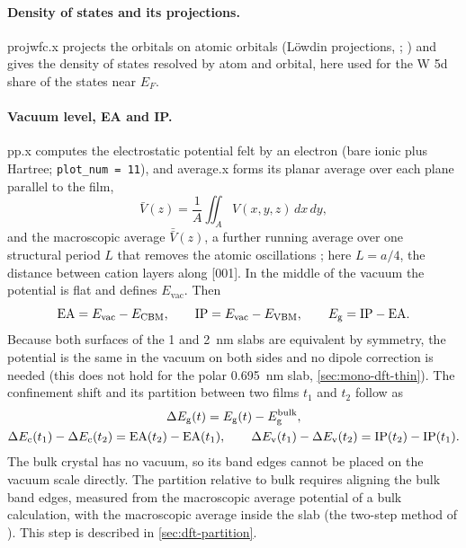 \paragraph{Density of states and its projections.} projwfc.x projects the orbitals on atomic orbitals (L\"owdin
projections, \citealp{Lowdin1950}; \citealp[p.~10]{Giannozzi2009}) and gives the density of states resolved by atom and
orbital, here used for the W 5d share of the states near $E_F$.

\paragraph{Vacuum level, EA and IP.} pp.x computes the electrostatic potential felt by an electron (bare ionic plus
Hartree; \texttt{plot\_num = 11}), and average.x forms its planar average over each plane parallel to the film,
\begin{equation}
\bar V(z) = \frac{1}{A}\iint_A V(x,y,z)\,dx\,dy ,
\label{eq:dft-planar}
\end{equation}
and the macroscopic average $\bar{\bar V}(z)$, a further running average over one structural period $L$ that removes the
atomic oscillations \citep{Baldereschi1988}\citep[p.~10]{Giannozzi2009}; here $L = a/4$, the distance between cation
layers along [001]. In the middle of the vacuum the potential is flat and defines $E_{\mathrm{vac}}$. Then
\begin{equation}
\mathrm{EA} = E_{\mathrm{vac}} - E_{\mathrm{CBM}}, \qquad \mathrm{IP} = E_{\mathrm{vac}} - E_{\mathrm{VBM}}, \qquad
E_{\mathrm{g}} = \mathrm{IP} - \mathrm{EA} .
\label{eq:dft-eaip}
\end{equation}
Because both surfaces of the 1 and 2~nm slabs are equivalent by symmetry, the potential is the same in the vacuum on both
sides and no dipole correction \citep{Neugebauer1992} is needed (this does not hold for the polar 0.695~nm slab,
\cref{sec:mono-dft-thin}). The confinement shift and its partition between two films $t_1$
and $t_2$ follow as
\begin{equation}
\begin{gathered}
\Delta E_{\mathrm{g}}(t) = E_{\mathrm{g}}(t) - E_{\mathrm{g}}^{\mathrm{bulk}}, \\
\Delta E_{\mathrm{c}}(t_1) - \Delta E_{\mathrm{c}}(t_2) = \mathrm{EA}(t_2) - \mathrm{EA}(t_1), \qquad
\Delta E_{\mathrm{v}}(t_1) - \Delta E_{\mathrm{v}}(t_2) = \mathrm{IP}(t_2) - \mathrm{IP}(t_1) .
\end{gathered}
\label{eq:dft-partition}
\end{equation}
The bulk crystal has no vacuum, so its band edges cannot be placed on the vacuum scale directly. The partition relative
to bulk requires aligning the bulk band edges, measured from the macroscopic average potential of a bulk calculation,
with the macroscopic average inside the slab (the two-step method of \citealp{VandeWalle1987,Baldereschi1988}). This
step is described in \cref{sec:dft-partition}.


